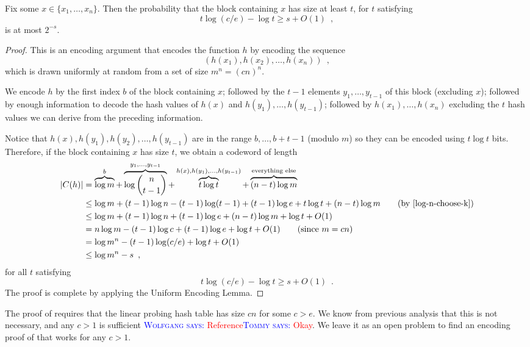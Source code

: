\documentclass{patmorin}
\newcommand{\aremark}[3]{\textcolor{blue}{\textsc{#1 #2:}}
  \textcolor{red}{\textsf{#3}}}
\newcommand{\tommy}[2][says]{\aremark{Tommy}{#1}{#2}}
\newcommand{\wolfgang}[2][says]{\aremark{Wolfgang}{#1}{#2}}
\begin{document}
\begin{thm}
  Fix some $x\in\{x_1,\ldots,x_n\}$. Then the probability that the
  block containing $x$ has size at least $t$, for $t$ satisfying
  \[
    t \log (c/e) - \log t \ge s + O(1) \enspace ,
  \]
  is at most $2^{-s}$.
\end{thm}

\begin{proof}
  This is an encoding argument that encodes the function $h$ by
  encoding the sequence
  \[
    (h(x_1),h(x_2),\ldots,h(x_n)) \enspace ,
  \]
  which is drawn uniformly at random from a set of size
  $m^n = (cn)^n$.
  
  We encode $h$ by the first index $b$ of the block containing $x$;
  followed by the $t-1$ elements $y_1,\ldots,y_{t-1}$ of this block
  (excluding $x$); followed by enough information to decode the hash
  values of $h(x)$ and $h(y_1),\ldots,h(y_{t-1})$; followed by
  $h(x_1),\ldots,h(x_n)$ excluding the $t$ hash values we can derive
  from the preceding information.

  Notice that $h(x),h(y_1),h(y_2),\ldots,h(y_{t-1})$ are in the range
  $b,\ldots,b+t-1$ (modulo $m$) so they can be encoded using
  $t\log t$ bits.  Therefore, if the block containing $x$ has size
  $t$, we obtain a codeword of length 
  \begin{align*}
    |C(h)| & = \overbrace{\log m}^{b} + \overbrace{\log\binom{n}{t-1}}^{y_1,\ldots,y_{t-1}} + \overbrace{t\log t}^{h(x),h(y_1),\ldots,h(y_{t-1})} + \overbrace{(n-t)\log m}^{\text{everything else}} \\
           & \le \log m + (t-1)\log n - 
             (t-1)\log(t-1) + (t-1)\log e + t\log t + (n-t)\log m \tag{by \eqref{log-n-choose-k}}\\
           & \le \log m + (t-1)\log n + (t-1)\log e + (n-t)\log m + \log t+ O(1)\\
           & = n\log m - (t-1)\log c + (t-1)\log e + \log t + O(1) \tag{since $m = cn$}\\
           & = \log m^n - (t-1)\log(c/e) + \log t + O(1) \\
           & \le \log m^n - s \enspace ,
  \end{align*}
  for all $t$ satisfying
  \[
    t \log (c/e) - \log t \ge s + O(1) \enspace .
  \]
  The proof is complete by applying the Uniform Encoding Lemma.
\end{proof}

\begin{rem}
  The proof of  requires that the linear
  probing hash table has size $cn$ for some $c>e$.  We know from
  previous analysis that this is not necessary, and any $c>1$ is
  sufficient \wolfgang{Reference}\tommy{Okay}\cite[Theorem~9.8]{flajolet.sedgewick:aofa}. 
  We leave it as an open problem to find an encoding proof
  of  that works for any $c>1$.
\end{rem}
\end{document}
